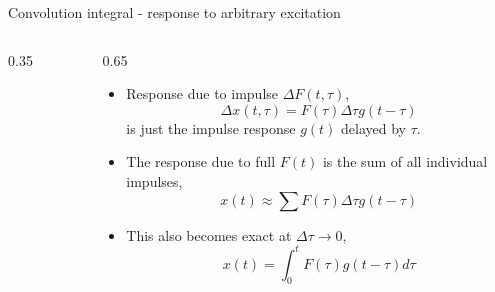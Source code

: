 \documentclass[11pt,aspectratio=169,handout]{beamer}
\begin{document}
%				


\begin{frame}[c]{Convolution integral - response to arbitrary excitation}
	\begin{columns}[T]
		\begin{column}{0.35\textwidth}
			\begin{figure}
				\centering
				\begin{overprint}
				\vspace{-0.4cm}
				\end{overprint}
			\end{figure}
		\end{column}
		\begin{column}{0.65\textwidth}			
			\begin{itemize}
				\item<1-> Response due to impulse $\Delta F(t,\tau)$,
				\begin{equation}
					\Delta x(t,\tau) =F(\tau) \Delta \tau g(t-\tau)
				\end{equation}
				is just the impulse response $g(t)$ delayed by $\tau$.
				\item<2-> The response due to full $F(t)$ is the sum of all individual impulses,
				\begin{equation}
					x(t) \approx \sum F(\tau) \Delta \tau g(t-\tau)
				\end{equation}
				\item<3-> This also becomes exact at $\Delta \tau \rightarrow 0$,
				\begin{equation}
					x(t) = \int_0^t F(\tau)  g(t-\tau) d\tau
				\end{equation}
			\end{itemize}
		\end{column}
	\end{columns}
\end{frame}
\end{document}
